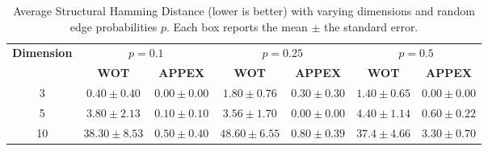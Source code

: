 \documentclass[twoside,11pt]{article}
\begin{document}
\begin{table}[h!]
  \centering
  \caption{Average Structural Hamming Distance (lower is better) with varying dimensions and random edge probabilities \( p \). Each box reports the mean $\pm$ the standard error.}
  \begin{tabular}{|c|c|c|c|c|c|c|}
    \hline
    \textbf{Dimension} & \multicolumn{2}{c|}{$p = 0.1$} & \multicolumn{2}{c|}{$p = 0.25$} & \multicolumn{2}{c|}{$p = 0.5$} \\
    \cline{2-7}
    & \textbf{WOT} & \textbf{APPEX} & \textbf{WOT} & \textbf{APPEX} & \textbf{WOT} & \textbf{APPEX} \\
    \hline
    3 & $0.40  \pm 0.40 $ & $\mathbf{0.00 \pm 0.00}$ & $1.80 \pm 0.76$ & $\mathbf{0.30 \pm 0.30}$ & $1.40 \pm 0.65$ & $\mathbf{0.00 \pm 0.00}$ \\
    \hline
    5 & $3.80 \pm 2.13$ & $\mathbf{0.10 \pm 0.10}$ & $3.56 \pm 1.70$ & $\mathbf{0.00 \pm 0.00}$ & $4.40 \pm 1.14$ & $\mathbf{0.60 \pm 0.22}$ \\
    \hline
    10 & $38.30 \pm 8.53$ & $\mathbf{0.50 \pm 0.40}$ & $48.60\pm 6.55$ & $\mathbf{0.80 \pm 0.39}$ & $37.4 \pm 4.66$& $\mathbf{3.30 \pm 0.70}$ \\
    \hline
  \end{tabular}
  \label{tab: causal_sufficiency_table}
\end{table}
\end{document}
